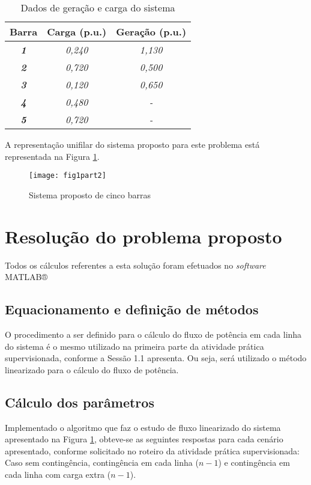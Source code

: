 \begin{table}[!h]
\centering
\caption{Dados de geração e carga do sistema}
\label{part2:dadossist2}
\begin{tabular}{|c|c|c|}
\hline
\textbf{Barra} & \textbf{Carga (p.u.)} & \textbf{Geração (p.u.)} \\ \hline
\textit{\textbf{1}} & \textit{0,240} & \textit{1,130} \\ \hline
\textit{\textbf{2}} & \textit{0,720} & \textit{0,500} \\ \hline
\textit{\textbf{3}} & \textit{0,120} & \textit{0,650} \\ \hline
\textit{\textbf{4}} & \textit{0,480} & \textit{-} \\ \hline
\textit{\textbf{5}} & \textit{0,720} & \textit{-} \\ \hline
\end{tabular}
\end{table}

A representação unifilar do sistema proposto para este problema está representada na Figura \ref{sistemaparte2}.

\begin{figure}[!h]
	\centering
	\texttt{[image: fig1part2]}
	\caption{Sistema proposto de cinco barras}
	\label{sistemaparte2}
\end{figure}

\section{Resolução do problema proposto}

	Todos os cálculos referentes a esta solução foram efetuados no \textit{software} MATLAB®

\subsection{Equacionamento e definição de métodos}

	O procedimento a ser definido para o cálculo do fluxo de potência em cada linha do sistema é o mesmo utilizado na primeira parte da atividade prática supervisionada, conforme a Sessão 1.1 apresenta. Ou seja, será utilizado o método linearizado para o cálculo do fluxo de potência.

\subsection{Cálculo dos parâmetros}
	
	Implementado o algoritmo que faz o estudo de fluxo linearizado do sistema apresentado na Figura \ref{sistemaparte2}, obteve-se as seguintes respostas para cada cenário apresentado, conforme solicitado no roteiro da atividade prática supervisionada: Caso sem contingência, contingência em cada linha ($n-1$) e contingência em cada linha com carga extra ($n-1$). 
	
